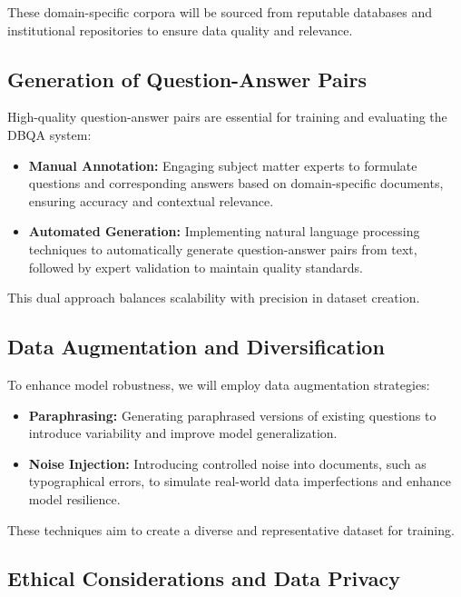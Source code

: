 \documentclass[sigconf]{acmart}
\begin{document}
These domain-specific corpora will be sourced from reputable databases and institutional repositories to ensure data quality and relevance.

\subsection{Generation of Question-Answer Pairs}

High-quality question-answer pairs are essential for training and evaluating the DBQA system:

\begin{itemize}
    \item \textbf{Manual Annotation:} Engaging subject matter experts to formulate questions and corresponding answers based on domain-specific documents, ensuring accuracy and contextual relevance.
    \item \textbf{Automated Generation:} Implementing natural language processing techniques to automatically generate question-answer pairs from text, followed by expert validation to maintain quality standards.
\end{itemize}

This dual approach balances scalability with precision in dataset creation.

\subsection{Data Augmentation and Diversification}

To enhance model robustness, we will employ data augmentation strategies:

\begin{itemize}
    \item \textbf{Paraphrasing:} Generating paraphrased versions of existing questions to introduce variability and improve model generalization.
    \item \textbf{Noise Injection:} Introducing controlled noise into documents, such as typographical errors, to simulate real-world data imperfections and enhance model resilience.
\end{itemize}

These techniques aim to create a diverse and representative dataset for training.

\subsection{Ethical Considerations and Data Privacy}
\end{document}
